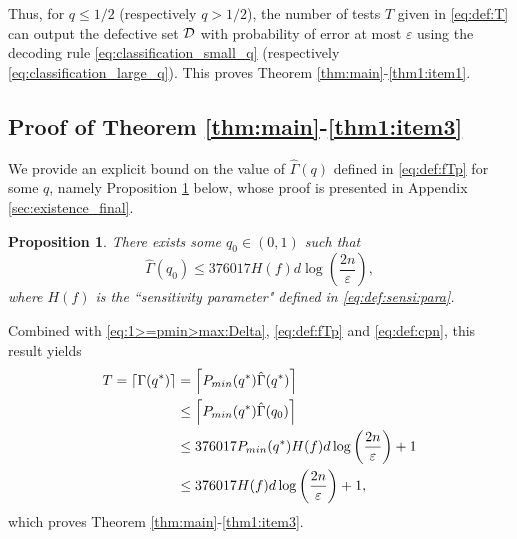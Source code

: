 \documentclass[onecolumn,letterpaper]{IEEEtran}
\newtheorem{proposition}{Proposition}
\newcommand{\cD}{{\cal D}}
\newcommand{\cp}{{q}}
\newcommand{\cpn}{{\cp^*}}
\newcommand{\pminn}{{P_{min}(\cpn)}}
\newcommand{\up}{{U}}
\newcommand{\lw}{{L}}
\newcommand{\fH}{{H(f)}}
\newcommand{\bet}{{\beta}}
\newcommand{\exifinal}{{ 376017 \times \frac{1}{\bet^2} \left( \frac{\up-\lw}{f(\up)-f(\lw)} \right)^2  d\log \left( \frac{2n}{\varepsilon } \right)}}
\newcommand{\ftau}{{\Gamma}}
\newcommand{\ftaup}{{\hat{\Gamma}}}
\newcommand{\fTp}{\ftaup (\cp)}
\newcommand{\fTn}{\ftau (\cpn)}
\newcommand{\fTpn}{\ftaup (\cpn)}
\newcommand{\cpns}{\cp_0}
\newcommand{\fTpns}{\ftaup (\cpns)}
\begin{document}
Thus, for $\cp \leq 1/2$ (respectively $\cp > 1/2$), the number of tests $T$ given in \eqref{eq:def:T} can output the defective set $\cD$ with probability of error at most $\varepsilon$ using the decoding rule \eqref{eq:classification_small_q} (respectively \eqref{eq:classification_large_q}). This proves Theorem \ref{thm:main}-\ref{thm1:item1}.

\subsection{Proof of Theorem \ref{thm:main}-\ref{thm1:item3}} \label{sec:proof_thm_1_3}

We provide an explicit bound on the value of $\fTp$ defined in \eqref{eq:def:fTp} for some $\cp$, namely Proposition \ref{prop:existence_final} below, whose proof is presented in Appendix \ref{sec:existence_final}. 
\begin{proposition}
\label{prop:existence_final}
There exists some $\cpns\in(0,1)$ such that
\begin{equation} 
\label{eq:existence}
\fTpns \leq 376017 \fH d\log \left( \frac{2n}{\varepsilon } \right),
\end{equation} 
where $\fH$ is the ``sensitivity parameter" defined in \eqref{eq:def:sensi:para}.
\end{proposition}
Combined with \eqref{eq:1>=pmin>max:Delta}, \eqref{eq:def:fTp} and \eqref{eq:def:cpn}, this result yields
\begin{align}
  T=\left\lceil \fTn \right\rceil &= \left \lceil \pminn \fTpn \right \rceil \notag\\
  &\leq \left \lceil \pminn \fTpns \right \rceil \notag\\
  &\leq 376017  \pminn  \fH d\log \left( \frac{2n}{\varepsilon } \right)+1 \label{eq:T:ub:Pmin}\\
  &\leq 376017 \fH d\log \left( \frac{2n}{\varepsilon } \right)+1,
\end{align}
which proves Theorem \ref{thm:main}-\ref{thm1:item3}.
\end{document}
